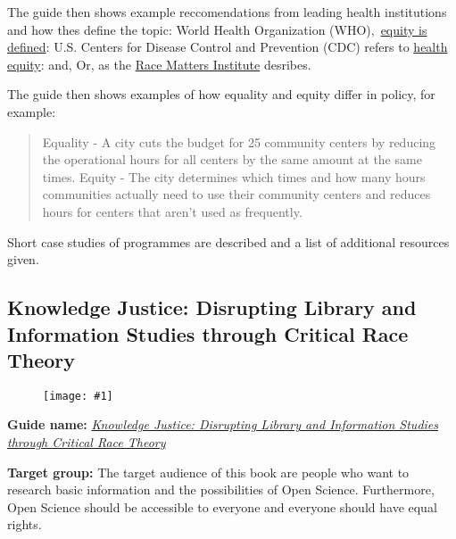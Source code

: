 \documentclass{article}
\newlength{\imgwidth}
\newcommand\scaledgraphics[2]{%
                
\settowidth{\imgwidth}{\texttt{[image: \#1]}}%
                
\setlength{\imgwidth}{\minof{\imgwidth}{#2\textwidth}}%
                
\texttt{[image: \#1]}%
                
}
\begin{document}
The guide then shows example reccomendations from leading health institutions and how thes define the topic: World Health Organization (WHO), \href{https://www.who.int/healthsystems/topics/equity/en/}{equity is defined}:  U.S. Centers for Disease Control and Prevention (CDC) refers to \href{https://www.cdc.gov/minorityhealth/strategies2016/index.html}{health equity}: and, Or, as the \href{http://viablefuturescenter.org/racemattersinstitute/}{Race Matters Institute} desribes.


The guide then shows examples of how equality and equity differ in policy, for example: 

\begin{quote}



Equality - A city cuts the budget for 25 community centers by reducing the operational hours for all centers by the same amount at the same times. Equity - The city determines which times and how many hours communities actually need to use their community centers and reduces hours for centers that aren’t used as frequently.


\end{quote}


Short case studies of programmes are described and a list of additional resources given.


\subsection{Knowledge Justice: Disrupting Library and Information Studies through Critical Race Theory}\label{H8244312}



\begin{center}
\begin{figure}
\scaledgraphics{dcc1d35b-4186-4b50-a5a6-cf54422a8064.jpeg}{0.75}
\label{F29320001}
\end{figure}


\end{center}


\textbf{Guide name:} \emph{\href{https://direct.mit.edu/books/edited-volume/5114/Knowledge-JusticeDisrupting-Library-and}{Knowledge Justice: Disrupting Library and Information Studies through Critical Race Theory}} \autocite{leung_knowledge_2021}


\textbf{Target group: }The target audience of this book are people who want to research basic information and the possibilities of Open Science. Furthermore, Open Science should be accessible to everyone and everyone should have equal rights.
\end{document}
